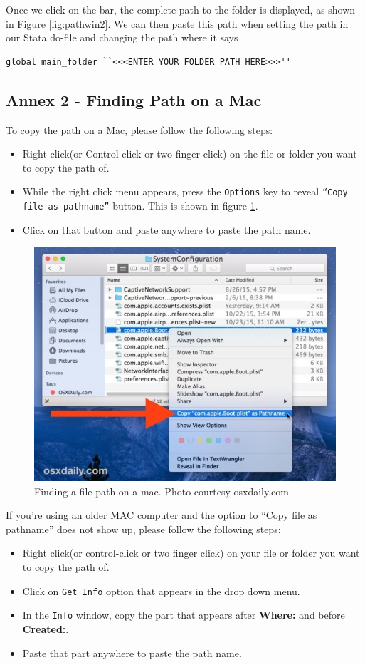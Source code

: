 \documentclass[]{article}
\begin{document}
Once we click on the bar, the complete path to the folder is displayed, as shown in Figure \ref{fig:pathwin2}. We can then paste this path when setting the path in our Stata do-file and changing the path where it says \begin{verbatim}
global main_folder ``<<<ENTER YOUR FOLDER PATH HERE>>>''
\end{verbatim} 

\newpage

\subsection*{Annex 2 - Finding Path on a Mac}\label{annex:mac}

To copy the path on a Mac, please follow the following steps: 

\begin{itemize}
	\item Right click(or Control-click or two finger click) on the file or folder you want to copy the path of.
	\item While the right click menu appears, press the \texttt{Options} key to reveal \texttt{``Copy file as pathname''} button. This is shown in figure \ref{fig:filepathmac}.
	\item Click on that button and paste anywhere to paste the path name.
\end{itemize}
\begin{figure}[H]
	\centering
	\includegraphics[width=0.7\linewidth]{../img/filepathmac}
	\caption{Finding a file path on a mac. Photo courtesy osxdaily.com}
	\label{fig:filepathmac}
\end{figure}

If you're using an older MAC computer and the option to ``Copy file as pathname'' does not show up, please follow  the following steps:

\begin{itemize}
	\item Right click(or control-click or two finger click) on your file or folder you want to copy the path of.
	\item Click on \texttt{Get Info} option that appears in the drop down menu.
	\item In the \texttt{Info} window, copy the part that appears after \textbf{Where:} and before \textbf{Created:}.
	\item Paste that part anywhere to paste the path name. 
\end{itemize}
\end{document}
